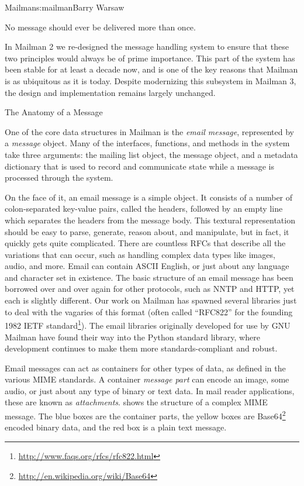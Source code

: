 \begin{aosachapter}{Mailman}{s:mailman}{Barry Warsaw}
\begin{aosaitemize}
\item No message should ever be delivered more than once.

\end{aosaitemize}

In Mailman 2 we re-designed the message handling system to ensure that
these two principles would always be of prime importance.  This part
of the system has been stable for at least a decade now, and is one of
the key reasons that Mailman is as ubiquitous as it is today.  Despite
modernizing this subsystem in Mailman 3, the design and implementation
remains largely unchanged.

\begin{aosasect1}{The Anatomy of a Message}

One of the core data structures in Mailman is the \emph{email
  message}, represented by a \emph{message} object.  Many of the
interfaces, functions, and methods in the system take three arguments:
the mailing list object, the message object, and a metadata dictionary
that is used to record and communicate state while a message is
processed through the system.

On the face of it, an email message is a simple object.  It consists
of a number of colon-separated key-value pairs, called the headers,
followed by an empty line which separates the headers from the message
body.  This textural representation should be easy to parse, generate,
reason about, and manipulate, but in fact, it quickly gets quite
complicated.  There are countless RFCs that describe all the
variations that can occur, such as handling complex data types like
images, audio, and more.  Email can contain ASCII English, or just
about any language and character set in existence.  The basic
structure of an email message has been borrowed over and over again
for other protocols, such as NNTP and HTTP, yet each is slightly
different.  Our work on Mailman has spawned several libraries just to
deal with the vagaries of this format (often called ``RFC822'' for the
founding 1982 IETF
standard\footnote{\url{http://www.faqs.org/rfcs/rfc822.html}}).  The
email libraries originally developed for use by GNU Mailman have found
their way into the Python standard library, where development
continues to make them more standards-compliant and robust.

Email messages can act as containers for other types of data, as
defined in the various MIME standards.  A container \emph{message
  part} can encode an image, some audio, or just about any type of
binary or text data.  In mail reader applications, these are known as
\emph{attachments}.   shows the structure
of a complex MIME message.  The blue boxes are the container parts,
the yellow boxes are
Base64\footnote{\url{http://en.wikipedia.org/wiki/Base64}} encoded
binary data, and the red box is a plain text message.


\end{aosasect1}
\end{aosachapter}
